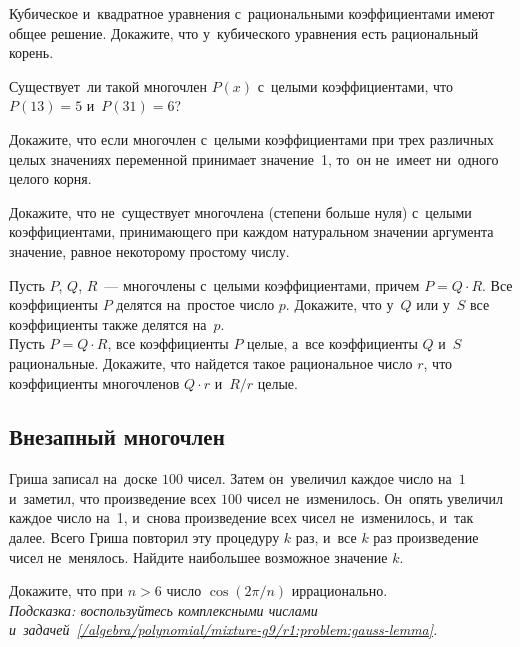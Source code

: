 \begin{problems}

\item
Кубическое и~квадратное уравнения с~рациональными коэффициентами имеют общее
решение.
Докажите, что у~кубического уравнения есть рациональный корень.

\item
Существует~ли такой многочлен $P(x)$ с~целыми коэффициентами, что
$P(13) = 5$ и~$P(31) = 6$?

\item
Докажите, что если многочлен с~целыми коэффициентами при трех различных целых
значениях переменной принимает значение~1, то~он не~имеет ни~одного целого
корня.

\item
Докажите, что не~существует многочлена (степени больше нуля) с~целыми
коэффициентами, принимающего при каждом натуральном значении аргумента
значение, равное некоторому простому числу.

\item
\label{/algebra/polynomial/mixture-g9/r1:problem:gauss-lemma}%
\sp
Пусть $P$, $Q$, $R$~--- многочлены с~целыми коэффициентами, причем
$P = Q \cdot R$.
Все коэффициенты $P$ делятся на~простое число $p$.
Докажите, что у~$Q$ или у~$S$ все коэффициенты также делятся на~$p$.
\\
\sp
Пусть $P = Q \cdot R$, все коэффициенты $P$ целые, а~все коэффициенты $Q$ и~$S$
рациональные.
Докажите, что найдется такое рациональное число $r$, что коэффициенты
многочленов $Q \cdot r$ и~$R / r$ целые.

\end{problems}

\subsection*{Внезапный многочлен}

\begin{problems}

\item
Гриша записал на~доске $100$ чисел.
Затем он~увеличил каждое число на~$1$ и~заметил, что произведение всех
$100$ чисел не~изменилось.
Он~опять увеличил каждое число на~1, и~снова произведение всех чисел
не~изменилось, и~так далее.
Всего Гриша повторил эту процедуру $k$ раз, и~все $k$ раз произведение чисел
не~менялось.
Найдите наибольшее возможное значение $k$.

\item
Докажите, что при $n > 6$ число $\cos(2 \pi / n)$ иррационально.
\\\emph{Подсказка: воспользуйтесь комплексными числами
и~задачей~\ref{/algebra/polynomial/mixture-g9/r1:problem:gauss-lemma}.}

\end{problems}

